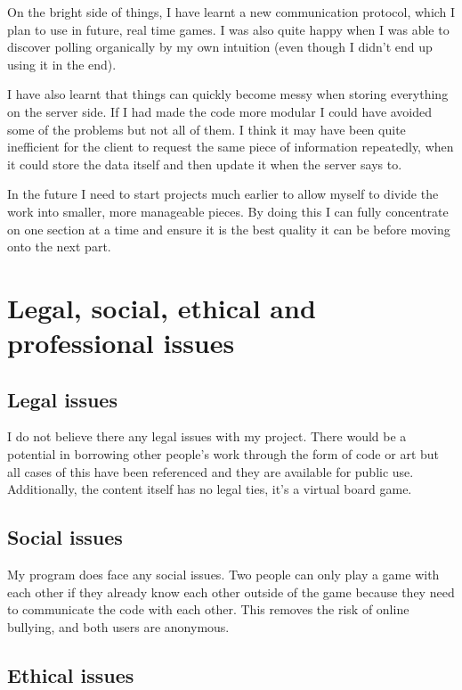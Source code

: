 \begin{appendices}
On the bright side of things, I have learnt a new communication protocol, which I plan to use in future, real time games. I was also quite happy when I was able to discover polling organically by my own intuition (even though I didn't end up using it in the end).

I have also learnt that things can quickly become messy when storing everything on the server side. If I had made the code more modular I could have avoided some of the problems but not all of them. I think it may have been quite inefficient for the client to request the same piece of information repeatedly, when it could store the data itself and then update it when the server says to.

In the future I need to start projects much earlier to allow myself to divide the work into smaller, more manageable pieces. By doing this I can fully concentrate on one section at a time and ensure it is the best quality it can be before moving onto the next part.

\section{Legal, social, ethical and professional issues}

\subsection{Legal issues}

I do not believe there any legal issues with my project. There would be a potential in borrowing other people's work through the form of code or art but all cases of this have been referenced and they are available for public use.
Additionally, the content itself has no legal ties, it's a virtual board game.

\subsection{Social issues}

My program does face any social issues. Two people can only play a game with each other if they already know each other outside of the game because they need to communicate the code with each other. This removes the risk of online bullying, and both users are anonymous.

\subsection{Ethical issues}


\end{appendices}
